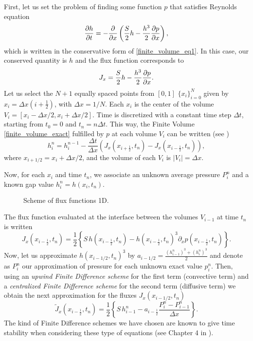 First, let us set the problem of finding some function $p$ that satisfies Reynolds equation
\begin{equation}
\parder{h}{t}=-\parder{}{x}\left(\frac{S}{2}h-\frac{h^3}{2}\parder{p}{x}\right),\label{eq:num_rey_without_cav}
\end{equation}
which is written in the conservative form of \eqref{finite_volume_eq1}. In this case, our conserved quantity is $h$ and the flux function corresponds to
\begin{equation*}
J_x=\frac{S}{2}h-\frac{h^3}{2}\frac{\partial p}{\partial x}.
\end{equation*}
Let us select the $N+1$ equally spaced points from $[0,1]$ $\{x_i\}_{i=0}^{N}$ given by $x_i=\Delta x\left(i+\frac{1}{2}\right)$, with $\Delta x=1/N$. Each $x_i$ is the center of the volume $V_i=[x_i-\Delta x/2,x_i+\Delta x/2]$. Time is discretized with a constant time step $\Delta t$, starting from $t_0=0$ and $t_n=n\Delta t$. This way, the Finite Volume \eqref{finite_volume_exact} fulfilled by $p$ at each volume $V_i$ can be written (see )
\begin{equation}
h_{i}^{n}=h_{i}^{n-1}-\frac{\Delta t}{\Delta x}\left(J_x\left(x_{i+\frac{1}{2}},t_n\right)-J_x\left(x_{i-\frac{1}{2}},t_n\right)\right),\label{eq:rey_fin_vol_1d_exact}
\end{equation}
where $x_{i+1/2}=x_i+\Delta x/2$, and the volume of each $V_i$ is $|V_i|=\Delta x$. 

Now, for each $x_i$ and time $t_n$, we associate an unknown average pressure $P_i^n$ and a known gap value $h_i^n=h(x_i,t_n)$. 
\begin{figure}[ht]
\centering 
\def\svgwidth{\textwidth}\small{
}\caption{Scheme of flux functions 1D.
}\label{fig:volume_v_i_1d}
\end{figure}

The flux function evaluated at the interface between the volumes $V_{i-1}$ at time $t_n$ is written
\begin{equation*}
J_x\left(x_{i-\frac{1}{2}},t_n\right) = \frac{1}{2}\left\{S\,h\left(x_{i-\frac{1}{2}},t_n\right)-h\left(x_{i-\frac{1}{2}},t_n\right)^3\partial_x p\left(x_{i-\frac{1}{2}},t_n\right)\right\}.
\end{equation*}
Now, let us approximate $h(x_{i-1/2},t_n)^3$ by $a_{i-1/2}=\frac{\left(h_{i-1}^n\right)^3+\left(h_i^n\right)^3}{2}$ and denote as $P_i^n$ our approximation of pressure for each unknown exact value $p_i^n$. Then, using an \emph{upwind Finite Difference scheme} for the first term (convective term) and a \emph{centralized Finite Difference scheme} for the second term (diffusive term) we obtain the next approximation for the fluxes $J_x\left(x_{i-1/2},t_n\right)$
\begin{equation}
\tilde{J}_x\left(x_{i-\frac{1}{2}},t_n\right)=\frac{1}{2}\left\{S\,h_{i-1}^n-a_{i-\frac{1}{2}}\frac{P^n_{i}-P^n_{i-1}}{\Delta x}\right\}.\label{eq:rey_app_Jx}
\end{equation}
The kind of Finite Difference schemes we have chosen are known to give time stability when considering these type of equations (see Chapter 4 in \cite{leveque2002}).

